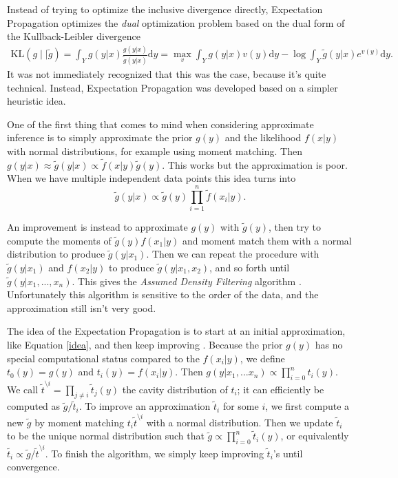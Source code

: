 \documentclass[12pt,vu]{adammath}
\newcommand\kl[2]{{\text{KL}({#1} \mid\mid {#2})}}
\theoremstyle{plain}
\theoremstyle{definition}
\theoremstyle{remark}
\begin{document}
Instead of trying to optimize the inclusive divergence directly, Expectation Propagation optimizes the \emph{dual} optimization problem \cite{minkaenergy} \cite{wain} based on the dual form of the Kullback-Leibler divergence
\begin{align*}
  \kl{g}{\tilde{g}} = \int_Y g(y|x) \frac{g(y|x)}{\tilde{g}(y|x)} \mathrm{d}y = \max_v \int_Y g(y|x) v(y) \mathrm{d}y - \log \int_Y \tilde{g}(y|x) e^{v(y)} \mathrm{d}y.
\end{align*}
It was not immediately recognized that this was the case, because it's quite technical.
Instead, Expectation Propagation was developed based on a simpler heuristic idea.

One of the first thing that comes to mind when considering approximate inference is to simply approximate the prior $g(y)$ and the likelihood $f(x|y)$ with normal distributions, for example using moment matching.
Then $g(y|x) \approx \tilde{g}(y|x) \propto \tilde{f}(x|y) \tilde{g}(y)$.
This works but the approximation is poor.
When we have multiple independent data points this idea turns into
\begin{equation}\label{idea}
  \tilde{g}(y|x) \propto \tilde{g}(y) \prod_{i=1}^n \tilde{f}(x_i|y).
\end{equation}

An improvement is instead to approximate $g(y)$ with $\tilde{g}(y)$, then try to compute the moments of $\tilde{g}(y) f(x_1|y)$ and moment match them with a normal distribution to produce $\tilde{g}(y | x_1)$.
Then we can repeat the procedure with $\tilde{g}(y | x_1)$ and $f(x_2 | y)$ to produce $\tilde{g}(y | x_1, x_2)$, and so forth until $\tilde{g}(y | x_1, ..., x_n)$.
This gives the \emph{Assumed Density Filtering} algorithm \cite{minkathesis}.
Unfortunately this algorithm is sensitive to the order of the data, and the approximation still isn't very good.

The idea of the Expectation Propagation is to start at an initial approximation, like Equation \ref{idea}, and then keep improving \cite{minkathesis}.
Because the prior $g(y)$ has no special computational status compared to the $f(x_i|y)$, we define $t_0(y) = g(y)$ and $t_i(y) = f(x_i|y)$.
Then $g(y|x_1, ... x_n) \propto \prod_{i=0}^n t_i(y)$.
We call $\tilde{t}^{\setminus i} = \prod_{j \ne i} \tilde{t}_j(y)$ the cavity distribution of $t_i$; it can efficiently be computed as $\tilde{g} / \tilde{t}_i$.
To improve an approximation $\tilde{t}_i$ for some $i$, we first compute a new $\tilde{g}$ by moment matching $t_i \tilde{t}^{\setminus i}$ with a normal distribution.
Then we update $\tilde{t}_i$ to be the unique normal distribution such that $\tilde{g} \propto \prod_{i=0}^n \tilde{t}_i(y)$, or equivalently $\tilde{t_i} \propto \tilde{g} / \tilde{t}^{\setminus i}$.
To finish the algorithm, we simply keep improving $\tilde{t}_i$'s until convergence.
\end{document}
